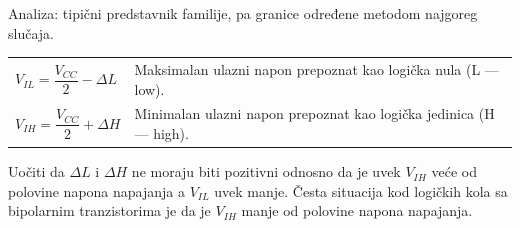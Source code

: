 \begin{frame}[label=08-s012]
Analiza: tipični predstavnik familije, pa granice određene metodom najgoreg slučaja.\par\medskip
\begin{tabularx}{\textwidth}{@{}lX@{}}
$V_{IL}=\dfrac{V_{CC}}2-\Delta L$ & Maksimalan ulazni napon prepoznat kao logička nula (L — low).\\[3mm]
$V_{IH}=\dfrac{V_{CC}}2+\Delta H$ & Minimalan ulazni napon prepoznat kao logička jedinica (H — high).
\end{tabularx}\par\medskip
\centering\par\medskip\raggedright
{\fontsize{11}{13}\selectfont\alert{Uočiti da $\Delta L$ i $\Delta H$ ne moraju biti pozitivni odnosno da je uvek $V_{IH}$ veće od polovine napona napajanja a $V_{IL}$ uvek manje. Česta situacija kod logičkih kola sa bipolarnim tranzistorima je da je $V_{IH}$ manje od polovine napona napajanja.}}
\end{frame}

